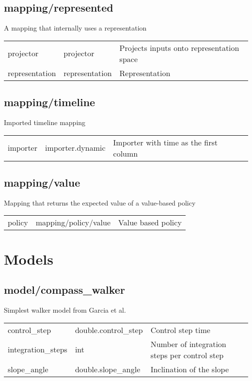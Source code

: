 \subsection{mapping/represented}
\noindent A mapping that internally uses a representation\\

\noindent\begin{tabular}{@{}lll@{}}
projector&projector&Projects inputs onto representation space\\
representation&representation&Representation\\
\end{tabular}
\subsection{mapping/timeline}
\noindent Imported timeline mapping\\

\noindent\begin{tabular}{@{}lll@{}}
importer&importer.dynamic&Importer with time as the first column\\
\end{tabular}
\subsection{mapping/value}
\noindent Mapping that returns the expected value of a value-based policy\\

\noindent\begin{tabular}{@{}lll@{}}
policy&mapping/policy/value&Value based policy\\
\end{tabular}
\section{Models}
\subsection{model/compass\_walker}
\noindent Simplest walker model from Garcia et al.\\

\noindent\begin{tabular}{@{}lll@{}}
control\_step&double.control\_step&Control step time\\
integration\_steps&int&Number of integration steps per control step\\
slope\_angle&double.slope\_angle&Inclination of the slope\\
\end{tabular}
